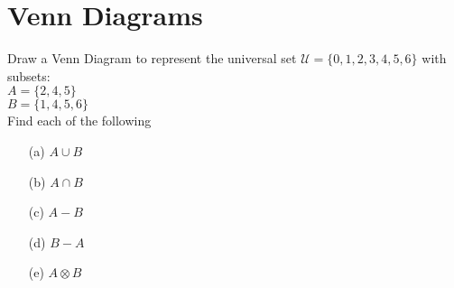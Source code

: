 

\newpage

\section*{Venn Diagrams}

Draw a Venn Diagram to represent the universal set
$\mathcal{U} = \{0,1,2,3,4,5,6\}$ with subsets:\\
$A = \{2,4,5\}$\\
$B = \{1,4,5,6\}$\\

\noindent Find each of the following
\begin{itemize}
\item[(a)] $A \cup B $
\item[(b)] $A \cap B $
\item[(c)] $A-B$
\item[(d)] $B-A$
\item[(e)] $A \otimes B$
\end{itemize}
\newpage
